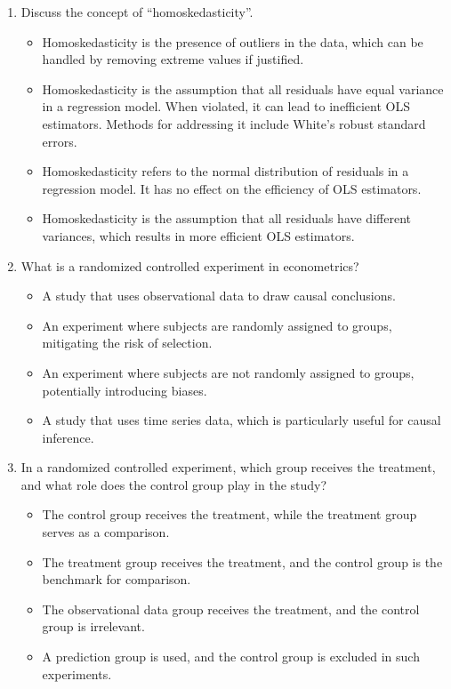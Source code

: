 \documentclass{article}
\begin{document}
\begin{enumerate}
\item Discuss the concept of ``homoskedasticity''.
\begin{itemize}
\item[A.] Homoskedasticity is the presence of outliers in the data, which can be handled by removing extreme values if justified.
\item[B.] Homoskedasticity is the assumption that all residuals have equal variance in a regression model. When violated, it can lead to inefficient OLS estimators. Methods for addressing it include White's robust standard errors.
\item[C.] Homoskedasticity refers to the normal distribution of residuals in a regression model. It has no effect on the efficiency of OLS estimators.
\item[D.] Homoskedasticity is the assumption that all residuals have different variances, which results in more efficient OLS estimators.
\end{itemize}

\item What is a randomized controlled experiment in econometrics?
  \begin{itemize}
  \item[A.] A study that uses observational data to draw causal conclusions.
  \item[B.] An experiment where subjects are randomly assigned to groups, mitigating the risk of selection.
  \item[C.] An experiment where subjects are not randomly assigned to groups, potentially introducing biases.
  \item[D.] A study that uses time series data, which is particularly useful for causal inference.
  \end{itemize}

\item In a randomized controlled experiment, which group receives the treatment, and what role does the control group play in the study?
  \begin{itemize}
  \item[A.] The control group receives the treatment, while the treatment group serves as a comparison.
  \item[B.] The treatment group receives the treatment, and the control group is the benchmark for comparison.
  \item[C.] The observational data group receives the treatment, and the control group is irrelevant.
  \item[D.] A prediction group is used, and the control group is excluded in such experiments.
  \end{itemize}


\end{enumerate}
\end{document}

